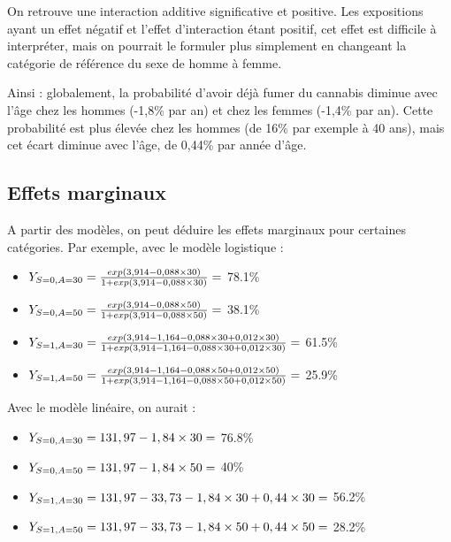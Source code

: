 \documentclass[
]{book}
\providecommand{\tightlist}{%
  \setlength{\itemsep}{0pt}\setlength{\parskip}{0pt}}
\begin{document}
On retrouve une interaction additive significative et positive. Les expositions ayant un effet négatif et l'effet d'interaction étant positif, cet effet est difficile à interpréter, mais on pourrait le formuler plus simplement en changeant la catégorie de référence du sexe de homme à femme.

Ainsi : globalement, la probabilité d'avoir déjà fumer du cannabis diminue avec l'âge chez les hommes (-1,8\% par an) et chez les femmes (-1,4\% par an). Cette probabilité est plus élevée chez les hommes (de 16\% par exemple à 40 ans), mais cet écart diminue avec l'âge, de 0,44\% par année d'âge.

\hypertarget{effets-marginaux}{%
\subsection{Effets marginaux}\label{effets-marginaux}}

A partir des modèles, on peut déduire les effets marginaux pour certaines catégories. Par exemple, avec le modèle logistique :

\begin{itemize}
\tightlist
\item
  \(\small Y_{S=0,A=30} = \frac{exp(3,914 - 0,088 \times 30)}{1+exp(3,914 - 0,088 \times 30)} =\) 78.1\%
\item
  \(\small Y_{S=0,A=50} = \frac{exp(3,914 - 0,088 \times 50)}{1+exp(3,914 - 0,088 \times 50)} =\) 38.1\%
\item
  \(\small Y_{S=1,A=30} = \frac{exp(3,914 - 1,164 - 0,088 \times 30 + 0,012 \times 30)}{1+exp(3,914 - 1,164 - 0,088 \times 30 + 0,012 \times 30)} =\) 61.5\%
\item
  \(\small Y_{S=1,A=50} = \frac{exp(3,914 - 1,164 - 0,088 \times 50 + 0,012 \times 50)}{1+exp(3,914 - 1,164 - 0,088 \times 50 + 0,012 \times 50)} =\) 25.9\%
\end{itemize}

Avec le modèle linéaire, on aurait :

\begin{itemize}
\tightlist
\item
  \(\small Y_{S=0,A=30} = 131,97 - 1,84 \times 30 =\) 76.8\%
\item
  \(\small Y_{S=0,A=50} = 131,97 - 1,84 \times 50 =\) 40\%
\item
  \(\small Y_{S=1,A=30} = 131,97 -33,73 - 1,84 \times 30 + 0,44 \times 30 =\) 56.2\%
\item
  \(\small Y_{S=1,A=50} = 131,97 -33,73 - 1,84 \times 50 + 0,44 \times 50 =\) 28.2\%
\end{itemize}
\end{document}
